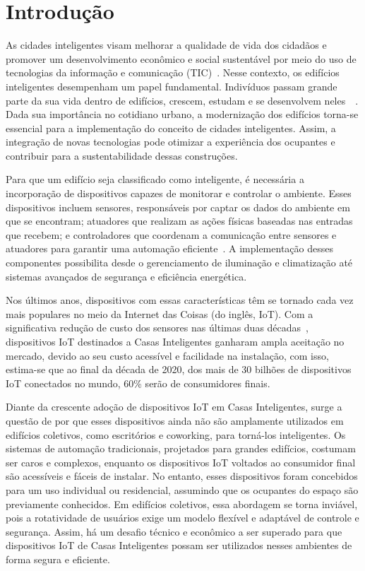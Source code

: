 \chapter{Introdução} 

As cidades inteligentes visam melhorar a qualidade de vida dos cidadãos e promover um desenvolvimento econômico e social sustentável por meio do 
uso de tecnologias da informação e comunicação (TIC)~\cite{cetic}. 
Nesse contexto, os edifícios inteligentes desempenham um papel fundamental. Indivíduos passam grande parte da sua vida dentro de edifícios, crescem, 
estudam e se desenvolvem neles~\cite{art1}~\cite{noauthor_how_nodate}. Dada sua importância no cotidiano urbano, a modernização dos edifícios 
torna-se essencial para a implementação do conceito de cidades inteligentes. Assim, a integração de novas tecnologias pode otimizar 
a experiência dos ocupantes e contribuir para a sustentabilidade dessas construções.

Para que um edifício seja classificado como inteligente, é necessária a incorporação de dispositivos capazes de monitorar e controlar o ambiente.
Esses dispositivos incluem sensores, responsáveis por captar os dados do ambiente em que se encontram; atuadores que realizam as ações
físicas baseadas nas entradas que recebem; e controladores que coordenam a comunicação entre sensores e atuadores para garantir uma automação
eficiente~\cite{Morvaj2011}. A implementação desses componentes possibilita desde o gerenciamento de iluminação e climatização até sistemas avançados
de segurança e eficiência energética.

Nos últimos anos, dispositivos com essas características têm se tornado cada vez mais populares no meio da Internet das Coisas (do inglês, IoT).
Com a significativa redução de custo dos sensores nas últimas duas décadas~\cite{microsoft1}, dispositivos IoT destinados 
a Casas Inteligentes ganharam ampla aceitação no mercado, devido ao seu custo acessível e facilidade na instalação, com isso, estima-se que ao final 
da década de 2020, dos mais de 30 bilhões de dispositivos IoT conectados no mundo, 
60\% serão de consumidores finais\cite{statista-iot-connected-devices}.

Diante da crescente adoção de dispositivos IoT em Casas Inteligentes, surge a questão de por que esses dispositivos ainda não são amplamente utilizados
em edifícios coletivos, como escritórios e coworking, para torná-los inteligentes. Os sistemas de automação tradicionais, projetados para grandes edifícios,
costumam ser caros e complexos, enquanto os dispositivos IoT voltados ao consumidor final são acessíveis e fáceis de instalar. No entanto, esses dispositivos
foram concebidos para um uso individual ou residencial, assumindo que os ocupantes do espaço são previamente conhecidos. Em edifícios coletivos, essa 
abordagem se torna inviável, pois a rotatividade de usuários exige um modelo flexível e adaptável de controle e segurança. Assim, há um desafio técnico e 
econômico a ser superado para que dispositivos IoT de Casas Inteligentes possam ser utilizados nesses ambientes de forma segura e eficiente.

